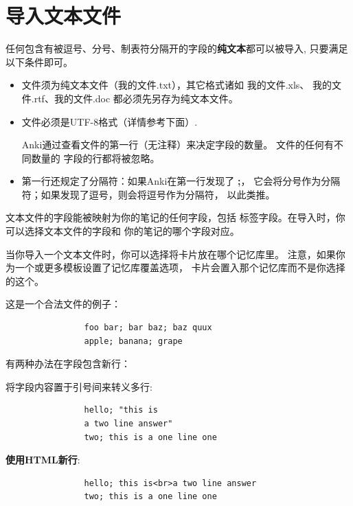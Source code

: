 \documentclass[a4paper]{book}
\begin{document}
			\section{导入文本文件}
			
			任何包含有被逗号、分号、制表符分隔开的字段的\textbf{纯文本}都可以被导入, 只要满足以下条件即可。
			
			\begin{itemize}
				\itemsep1pt\parskip0pt
				\item 文件须为纯文本文件（我的文件.txt），其它格式诸如 我的文件.xls、 我的文件.rtf、我的文件.doc 都必须先另存为纯文本文件。
				\item 文件必须是UTF-8格式（详情参考下面）.
				
				Anki通过查看文件的第一行（无注释）来决定字段的数量。 文件的任何有不同数量的 字段的行都将被忽略。
				\item 第一行还规定了分隔符：如果Anki在第一行发现了 \textbf{;}， 它会将分号作为分隔符；如果发现了逗号，则会将逗号作为分隔符， 以此类推。
			\end{itemize}
			
			文本文件的字段能被映射为你的笔记的任何字段，包括 标签字段。在导入时，你可以选择文本文件的字段和 你的笔记的哪个字段对应。
			
			当你导入一个文本文件时，你可以选择将卡片放在哪个记忆库里。 注意，如果你为一个或更多模板设置了记忆库覆盖选项， 卡片会置入那个记忆库而不是你选择的这个。
			
			这是一个合法文件的例子：
			\begin{shaded}\begin{verbatim}
				foo bar; bar baz; baz quux
				apple; banana; grape
				\end{verbatim}\end{shaded}
			有两种办法在字段包含新行：
			
			将字段内容置于引号间来转义多行:
			
			\begin{shaded}\begin{verbatim}
				hello; "this is
				a two line answer"
				two; this is a one line one
				\end{verbatim}\end{shaded}
			
			\textbf{使用HTML新行}:
			
			\begin{shaded}\begin{verbatim}
				hello; this is<br>a two line answer
				two; this is a one line one
				\end{verbatim}\end{shaded}
			
\end{document}
